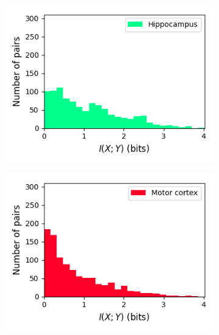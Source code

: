 \documentclass[a4paper,12pt]{article}
\theoremstyle{definition}
\begin{document}
\begin{figure}[p]
  \begin{subfigure}{0.5\textwidth}
    \centering
    \includegraphics[width=\textwidth]{figures/all_hippocampus_8_1p0_information_histogram.png}
  \end{subfigure}
  \begin{subfigure}{0.5\textwidth}
    \centering
    \includegraphics[width=\textwidth]{figures/all_motor_cortex_8_1p0_information_histogram.png}
  \end{subfigure}
  \begin{subfigure}{0.5\textwidth}
    \centering

\end{subfigure}
\end{figure}
\end{document}
